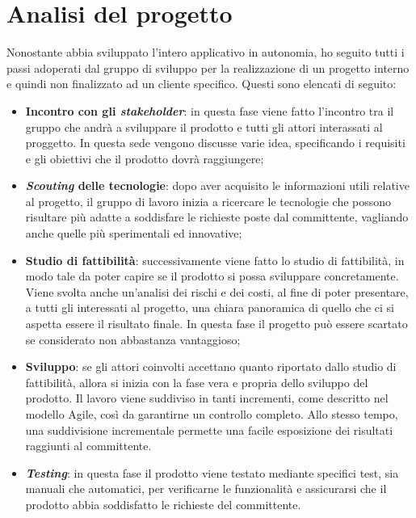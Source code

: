\section{Analisi del progetto}
Nonostante abbia sviluppato l'intero applicativo in autonomia, ho seguito tutti i passi adoperati dal gruppo di sviluppo per la realizzazione
di un progetto interno e quindi non finalizzato ad un cliente specifico.
Questi sono elencati di seguito:
\begin{itemize}
    \item \textbf{Incontro con gli \emph{stakeholder}}: in questa fase viene fatto l’incontro tra il gruppo che andrà a sviluppare il prodotto e tutti 
    gli attori interassati al proggetto. In questa sede vengono discusse varie idea, specificando i requisiti e gli obiettivi che il prodotto dovrà 
    raggiungere;
    \item \textbf{\emph{Scouting} delle tecnologie}: dopo aver acquisito le informazioni utili relative al progetto, il gruppo di lavoro inizia a ricercare 
    le tecnologie che possono risultare più adatte a soddisfare le richieste poste dal committente, vagliando anche quelle più sperimentali ed innovative;
    \item \textbf{Studio di fattibilità}: successivamente viene fatto lo studio di fattibilità, in modo tale da poter capire se il prodotto si possa sviluppare 
    concretamente. Viene svolta anche un’analisi dei rischi e dei costi, al fine di poter presentare, a tutti gli interessati al progetto, una chiara panoramica
    di quello che ci si aspetta essere il risultato finale. In questa fase il progetto può essere scartato se considerato non abbastanza vantaggioso;
    \item \textbf{Sviluppo}: se gli attori coinvolti accettano quanto riportato dallo studio di fattibilità, allora si inizia con la fase vera 
    e propria dello sviluppo del prodotto. 
    Il lavoro viene suddiviso in tanti incrementi, come descritto nel modello Agile, così da garantirne un controllo completo. Allo stesso tempo,
    una suddivisione incrementale permette una facile esposizione dei risultati raggiunti al committente.
    \item \textbf{\emph{Testing}}: in questa fase il prodotto viene testato mediante specifici test, sia manuali che automatici, per verificarne le 
    funzionalità e assicurarsi che il prodotto abbia soddisfatto le richieste del committente.
\end{itemize}

